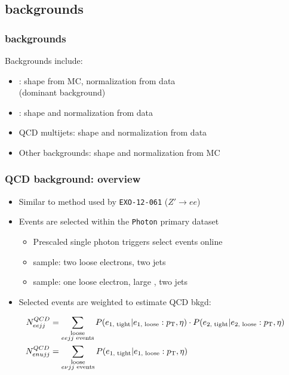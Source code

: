 \documentclass[bigger]{beamer}
\begin{document}
\subsection{\eejj backgrounds}
\label{sec-2-2}
\begin{frame}
\frametitle{\eejj backgrounds}
\label{sec-2-2-1}
\begin{block}{Backgrounds include:}
\label{sec-2-2-1-1}
\begin{itemize}

\item \zjets: shape from MC, normalization from data \\ (dominant background)
\label{sec-2-2-1-1-1}%

\item \ttbar: shape and normalization from data
\label{sec-2-2-1-1-2}%

\item QCD multijets: shape and normalization from data
\label{sec-2-2-1-1-3}%

\item Other backgrounds: shape and normalization from MC
\label{sec-2-2-1-1-4}%
\end{itemize} %
\end{block}
\end{frame}
\begin{frame}
\frametitle{QCD background: overview}
\label{sec-2-2-2}
\label{sec-2-2-2-1}

\begin{itemize}
\item Similar to method used by \texttt{EXO-12-061} ($Z'\rightarrow ee$)
\item Events are selected within the \texttt{Photon} primary dataset
\begin{itemize}
\item Prescaled single photon triggers select events online
\item \eejj sample: two loose electrons, two jets
\item \enujj sample: one loose electron, large \met, two jets
\end{itemize}
\item Selected events are weighted to estimate QCD bkgd:
\end{itemize}
\begin{align*}
N_{eejj}^{QCD}  &= \sum_{\substack{\text{loose} \\eejj \text{ events}}} P(e_{\text{1, tight}} | e_{\text{1, loose}}:p_{\text{T}}, \eta) \cdot P(e_{\text{2, tight}} | e_{\text{2, loose}}:p_{\text{T}}, \eta) \\
N_{enujj}^{QCD} &= \sum_{\substack{\text{loose} \\e\nu jj \text{ events}}} P(e_{\text{1, tight}} | e_{\text{1, loose}}:p_{\text{T}}, \eta) 
\end{align*}
\end{frame}
\end{document}
